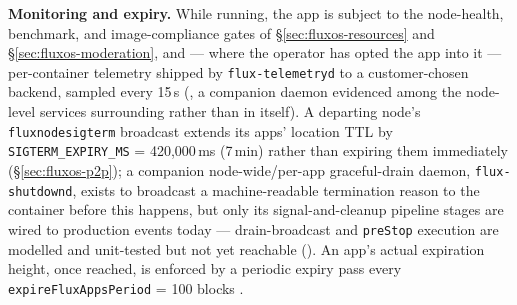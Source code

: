 \textbf{Monitoring and expiry.} While running, the app is subject to the node-health, benchmark,
and image-compliance gates of \S\ref{sec:fluxos-resources} and \S\ref{sec:fluxos-moderation}, and —
where the operator has opted the app into it — per-container telemetry shipped by
\texttt{flux-\allowbreak{}telemetryd} to a customer-chosen backend, sampled every 15\,s
  (\shipped, a
companion daemon evidenced among the node-level services surrounding \FluxOS rather than in
\FluxOS itself). A departing node's \texttt{fluxnodesigterm} broadcast extends its apps' location
TTL by \texttt{SIGTERM\_EXPIRY\_MS} = 420{,}000\,ms (7\,min) rather than expiring them immediately
(\S\ref{sec:fluxos-p2p}); a companion node-wide/per-app graceful-drain daemon,
\texttt{flux-shutdownd}, exists to broadcast a machine-readable termination reason to the container
before this happens, but only its signal-and-cleanup pipeline stages are wired to production
events today — drain-broadcast and \texttt{preStop} execution are modelled and unit-tested but not
yet reachable 
(\inprogress). An app's actual expiration height, once reached, is
enforced by a periodic expiry pass every \texttt{expire\allowbreak{}Flux\allowbreak{}Apps\allowbreak{}Period} = 100 blocks
.

